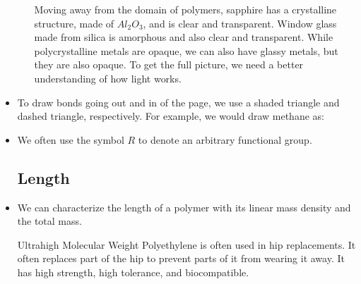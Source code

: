 \begin{itemize}
\begin{itemize}
\begin{case}
        Moving away from the domain of polymers, sapphire has a crystalline structure, made of $Al_2O_3$, and is clear and transparent. Window glass made from silica is amorphous and also clear and transparent. While polycrystalline metals are opaque, we can also have glassy metals, but they are also opaque. To get the full picture, we need a better understanding of how light works.
    \end{case}
    \end{itemize}
    \item To draw bonds going out and in of the page, we use a shaded triangle and dashed triangle, respectively. For example, we would draw methane as:
    \begin{center}
    \end{center}
    \item We often use the symbol $R$ to denote an arbitrary functional group.
    \subsection{Length}
    \item We can characterize the length of a polymer with its linear mass density and the total mass.
    \begin{case}
        Ultrahigh Molecular Weight Polyethylene is often used in hip replacements. It often replaces part of the hip to prevent parts of it from wearing it away. It has high strength, high tolerance, and biocompatible.
        \vspace{2mm}


\end{case}
\end{itemize}
